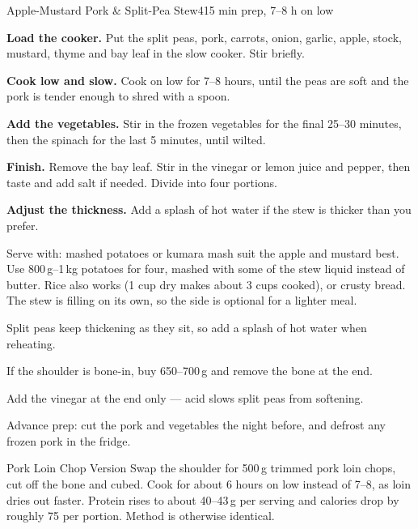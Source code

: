 \begin{recipebox}{Apple-Mustard Pork \& Split-Pea Stew}{4}{15 min prep, 7--8 h on low}
\begin{method}
  \item \textbf{Load the cooker.} Put the split peas, pork, carrots, onion,
        garlic, apple, stock, mustard, thyme and bay leaf in the slow cooker.
        Stir briefly.
  \item \textbf{Cook low and slow.} Cook on low for 7--8 hours, until the peas
        are soft and the pork is tender enough to shred with a spoon.
  \item \textbf{Add the vegetables.} Stir in the frozen vegetables for the final
        25--30 minutes, then the spinach for the last 5 minutes, until wilted.
  \item \textbf{Finish.} Remove the bay leaf. Stir in the vinegar or lemon juice
        and pepper, then taste and add salt if needed. Divide into four portions.
  \item \textbf{Adjust the thickness.} Add a splash of hot water if the stew is
        thicker than you prefer.
\end{method}

\begin{notelist}
  \item Serve with: mashed potatoes or kumara mash suit the apple and
        mustard best. Use 800\,g--1\,kg potatoes for four, mashed with some
        of the stew liquid instead of butter. Rice also works (1 cup dry
        makes about 3 cups cooked), or crusty bread. The stew is filling on
        its own, so the side is optional for a lighter meal.
  \item Split peas keep thickening as they sit, so add a splash of hot water
        when reheating.
  \item If the shoulder is bone-in, buy 650--700\,g and remove the bone at the end.
  \item Add the vinegar at the end only --- acid slows split peas from softening.
  \item Advance prep: cut the pork and vegetables the night before, and defrost
        any frozen pork in the fridge.
\end{notelist}

\begin{variationbox}{Pork Loin Chop Version}
Swap the shoulder for 500\,g trimmed pork loin chops, cut off the bone and
cubed. Cook for about 6 hours on low instead of 7--8, as loin dries out faster.
Protein rises to about 40--43\,g per serving and calories drop by roughly 75 per
portion. Method is otherwise identical.
\end{variationbox}

\end{recipebox}
